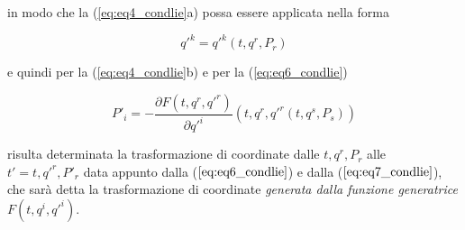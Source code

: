 in modo che la (\ref{eq:eq4_condlie}a) possa essere applicata nella forma 

\begin{equation} \label{eq:eq6_condlie}
  q'^k = q'^k (t, q^r, P_r)
\end{equation}

e quindi per la (\ref{eq:eq4_condlie}b) e per la (\ref{eq:eq6_condlie})

\begin{equation} \label{eq:eq7_condlie}
  P'_i = - \frac{\partial F (t, q^r, q'^r)}{\partial q'^i} \left(t, q^r, q'^r (t, q^s, P_s) \right)
\end{equation}

risulta determinata la trasformazione di coordinate dalle $ t, q^r, P_r $ alle 
$ t' = t, q'^r, P'_r $ data appunto dalla ($ \ref{eq:eq6_condlie} $) e dalla ($ \ref{eq:eq7_condlie} $), che sarà detta la trasformazione di coordinate \textit{generata dalla funzione generatrice} $ F (t, q^i, q'^i) $.